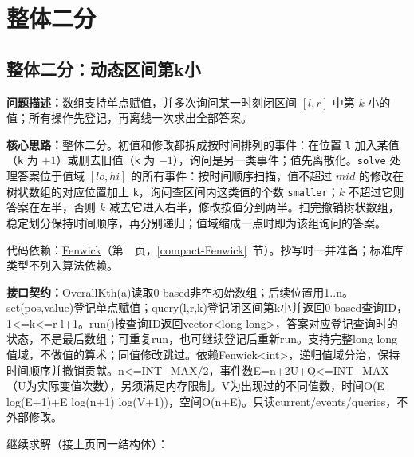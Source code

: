 \Needspace{180pt}

\section{整体二分}

\subsection{整体二分：动态区间第k小}\label{compact-OverallKth}

\noindent\textbf{问题描述：}\allowbreak 数组支持单点赋值，并多次询问某一时刻闭区间 $[l,r]$ 中第 $k$ 小的值；所有操作先登记，再离线一次求出全部答案。

\textbf{核心思路：}\allowbreak 整体二分。初值和修改都拆成按时间排列的事件：在位置 \texttt{l} 加入某值（\texttt{k} 为 $+1$）或删去旧值（\texttt{k} 为 $-1$），询问是另一类事件；值先离散化。\texttt{solve} 处理答案位于值域 $[lo,hi]$ 的所有事件：按时间顺序扫描，值不超过 $mid$ 的修改在树状数组的对应位置加上 \texttt{k}，询问查区间内这类值的个数 \texttt{smaller}；$k$ 不超过它则答案在左半，否则 $k$ 减去它进入右半，修改按值分到两半。扫完撤销树状数组，稳定划分保持时间顺序，再分别递归；值域缩成一点时即为该组询问的答案。

代码依赖：\hyperref[compact-Fenwick]{Fenwick}（第~\pageref{compact-Fenwick}~页，\ref{compact-Fenwick}~节）。抄写时一并准备；标准库类型不列入算法依赖。

{\sloppy{}\noindent\textbf{接口契约：}OverallKth(a)读取0-based非空初始数组；后续位置用1..n。set(pos,value)登记单点赋值；query(l,r,k)登记闭区间第k小并返回0-based查询ID，1<=k<=r-l+1。run()按查询ID返回vector<long long>，答案对应登记查询时的状态，不是最后数组；可重复run，也可继续登记后重新run。支持完整long long值域，不做值的算术；同值修改跳过。依赖Fenwick<int>，递归值域分治，保持时间顺序并撤销贡献。n<=INT\_MAX/2，事件数E=n+2U+Q<=INT\_MAX（U为实际变值次数），另须满足内存限制。V为出现过的不同值数，时间O(E log(E+1)+E log(n+1) log(V+1))，空间O(n+E)。只读current/events/queries，不外部修改。\par}

\Needspace{572pt}



\newpage

\noindent 继续求解（接上页同一结构体）：



